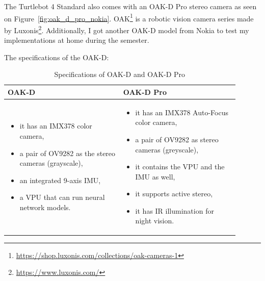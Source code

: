 The Turtlebot 4 Standard also comes with an OAK-D Pro stereo camera as seen on Figure~\ref{fig:oak_d_pro_nokia}. OAK\footnote{\url{https://shop.luxonis.com/collections/oak-cameras-1}} is a robotic vision camera series made by Luxonis\footnote{\url{https://www.luxonis.com/}}. Additionally, I got another OAK-D model from Nokia to test my implementations at home during the semester.

The specifications of the OAK-D:
\begin{table}[h!]
\centering
\begin{tabular}{|>{\raggedright\arraybackslash}p{0.45\linewidth}|>{\raggedright\arraybackslash}p{0.45\linewidth}|}
\hline
\textbf{OAK-D} & \textbf{OAK-D Pro} \\
\hline
\begin{itemize}
    \setlength\itemsep{0em}
    \item it has an IMX378 color camera,
    \item a pair of OV9282 as the stereo cameras (grayscale),
    \item an integrated 9-axis IMU,
    \item a VPU that can run neural network models.
\end{itemize} &
\begin{itemize}
    \setlength\itemsep{0em}
    \item it has an IMX378 Auto-Focus color camera,
    \item a pair of OV9282 as stereo cameras (greyscale),
    \item it contains the VPU and the IMU as well,
    \item it supports active stereo,
    \item it has IR illumination for night vision.
\end{itemize} \\
\hline
\end{tabular}
\caption{Specifications of OAK-D and OAK-D Pro}
\end{table}



